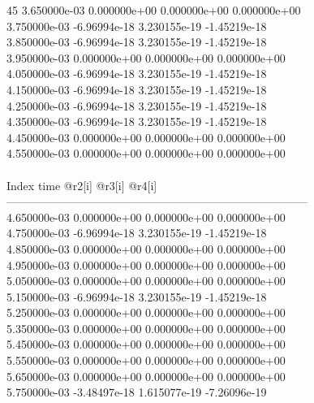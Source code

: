 45	3.650000e-03	0.000000e+00	0.000000e+00	0.000000e+00	\\ 	3.750000e-03	-6.96994e-18	3.230155e-19	-1.45219e-18	\\ 	3.850000e-03	-6.96994e-18	3.230155e-19	-1.45219e-18	\\ 	3.950000e-03	0.000000e+00	0.000000e+00	0.000000e+00	\\ 	4.050000e-03	-6.96994e-18	3.230155e-19	-1.45219e-18	\\ 	4.150000e-03	-6.96994e-18	3.230155e-19	-1.45219e-18	\\ 	4.250000e-03	-6.96994e-18	3.230155e-19	-1.45219e-18	\\ 	4.350000e-03	-6.96994e-18	3.230155e-19	-1.45219e-18	\\ 	4.450000e-03	0.000000e+00	0.000000e+00	0.000000e+00	\\ 	4.550000e-03	0.000000e+00	0.000000e+00	0.000000e+00	\\ \hline
\\ \hline
Index   time            @r2[i]          @r3[i]          @r4[i]          \\ \hline
--------------------------------------------------------------------------------\\ 	4.650000e-03	0.000000e+00	0.000000e+00	0.000000e+00	\\ 	4.750000e-03	-6.96994e-18	3.230155e-19	-1.45219e-18	\\ 	4.850000e-03	0.000000e+00	0.000000e+00	0.000000e+00	\\ 	4.950000e-03	0.000000e+00	0.000000e+00	0.000000e+00	\\ 	5.050000e-03	0.000000e+00	0.000000e+00	0.000000e+00	\\ 	5.150000e-03	-6.96994e-18	3.230155e-19	-1.45219e-18	\\ 	5.250000e-03	0.000000e+00	0.000000e+00	0.000000e+00	\\ 	5.350000e-03	0.000000e+00	0.000000e+00	0.000000e+00	\\ 	5.450000e-03	0.000000e+00	0.000000e+00	0.000000e+00	\\ 	5.550000e-03	0.000000e+00	0.000000e+00	0.000000e+00	\\ 	5.650000e-03	0.000000e+00	0.000000e+00	0.000000e+00	\\ 	5.750000e-03	-3.48497e-18	1.615077e-19	-7.26096e-19	\\ \hline

